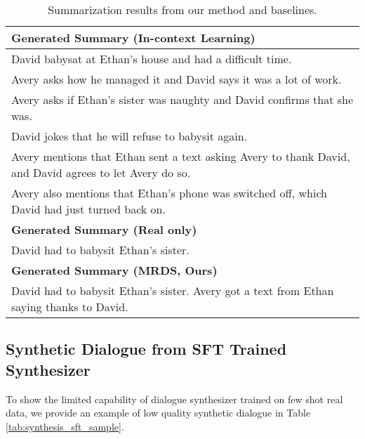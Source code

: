 \begin{table*}[]
\begin{tabular}{l}
\hline
\textbf{Generated Summary (In-context Learning)} \\ \hline
David babysat at Ethan's house and had a difficult time. \\ Avery asks how he managed it and David says it was a lot of work. \\ Avery asks if Ethan's sister was naughty and David confirms that she was. \\ David jokes that he will refuse to babysit again. \\ Avery mentions that Ethan sent a text asking Avery to thank David, and David agrees to let Avery do so. \\ Avery also mentions that Ethan's phone was switched off, which David had just turned back on. \\
\hline
\textbf{Generated Summary (Real only)} \\ \hline
David had to babysit Ethan's sister. \\
\hline
\textbf{Generated Summary (MRDS, Ours)} \\ \hline
David had to babysit Ethan's sister. Avery got a text from Ethan saying thanks to David.\\
\hline
\end{tabular}
\caption{Summarization results from our method and baselines.}
\label{tab:summ_example_1}
\end{table*}

\subsection{Synthetic Dialogue from SFT Trained Synthesizer}
To show the limited capability of dialogue synthesizer trained on few shot real data, we provide an example of low quality synthetic dialogue in Table \ref{tab:synthesis_sft_sample}.

